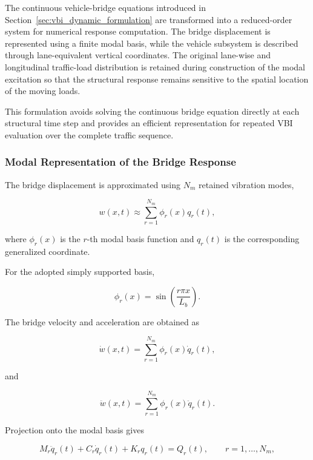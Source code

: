 \documentclass[journal]{IEEEtran}
\begin{document}
The continuous vehicle-bridge
equations introduced in Section~\ref{sec:vbi_dynamic_formulation} are transformed into a reduced-order system
for numerical response computation. The bridge displacement is represented
using a finite modal basis, while the vehicle subsystem is described through
lane-equivalent vertical coordinates. The original lane-wise and longitudinal
traffic-load distribution is retained during construction of the modal
excitation so that the structural response remains sensitive to the spatial
location of the moving loads.

This formulation avoids
solving the continuous bridge equation directly at each structural time step
and provides an efficient representation for repeated VBI evaluation over the
complete traffic sequence.



\subsubsection{Modal Representation of the Bridge Response}

The bridge displacement
is approximated using $N_m$ retained vibration
modes,

\begin{equation}
w(x,t)
\approx
\sum_{r=1}^{N_m}
\phi_r(x)q_r(t),
\end{equation}

where $\phi_r(x)$ is the $r$-th modal basis
function and $q_r(t)$ is the corresponding
generalized coordinate.

For the adopted simply
supported basis,

\begin{equation}
\phi_r(x)
=
\sin
\left(
\frac{r\pi x}{L_b}
\right).
\end{equation}

The bridge velocity and
acceleration are obtained as

\begin{equation}
\dot{w}(x,t)
=
\sum_{r=1}^{N_m}
\phi_r(x)\dot{q}_r(t),
\end{equation}

and

\begin{equation}
\ddot{w}(x,t)
=
\sum_{r=1}^{N_m}
\phi_r(x)\ddot{q}_r(t).
\end{equation}

Projection onto the
modal basis gives

\begin{equation}
M_r\ddot{q}_r(t)
+
C_r\dot{q}_r(t)
+
K_rq_r(t)
=
Q_r(t),
\qquad
r=1,\ldots,N_m,
\end{equation}
\end{document}
